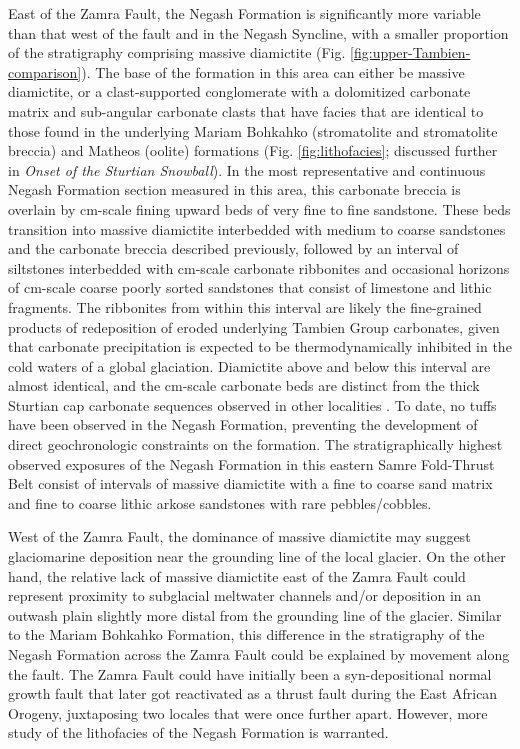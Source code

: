 East of the Zamra Fault, the Negash Formation is significantly more variable than that west of the fault and in the Negash Syncline, with a smaller proportion of the stratigraphy comprising massive diamictite (Fig. \ref{fig:upper-Tambien-comparison}). The base of the formation in this area can either be massive diamictite, or a clast-supported conglomerate with a dolomitized carbonate matrix and sub-angular carbonate clasts that have facies that are identical to those found in the underlying Mariam Bohkahko (stromatolite and stromatolite breccia) and Matheos (oolite) formations (Fig. \ref{fig:lithofacies}; discussed further in \textit{Onset of the Sturtian Snowball}). In the most representative and continuous Negash Formation section measured in this area, this carbonate breccia is overlain by cm-scale fining upward beds of very fine to fine sandstone. These beds transition into massive diamictite interbedded with medium to coarse sandstones and the carbonate breccia described previously, followed by an interval of siltstones interbedded with cm-scale carbonate ribbonites and occasional horizons of cm-scale coarse poorly sorted sandstones that consist of limestone and lithic fragments. The ribbonites from within this interval are likely the fine-grained products of redeposition of eroded underlying Tambien Group carbonates, given that carbonate precipitation is expected to be thermodynamically inhibited in the cold waters of a global glaciation. Diamictite above and below this interval are almost identical, and the cm-scale carbonate beds are distinct from the thick Sturtian cap carbonate sequences observed in other localities \citep{Kennedy1998a, Hoffman2011a}. To date, no tuffs have been observed in the Negash Formation, preventing the development of direct geochronologic constraints on the formation. The stratigraphically highest observed exposures of the Negash Formation in this eastern Samre Fold-Thrust Belt consist of intervals of massive diamictite with a fine to coarse sand matrix and fine to coarse lithic arkose sandstones with rare pebbles/cobbles.

West of the Zamra Fault, the dominance of massive diamictite may suggest glaciomarine deposition near the grounding line of the local glacier. On the other hand, the relative lack of massive diamictite east of the Zamra Fault could represent proximity to subglacial meltwater channels and/or deposition in an outwash plain slightly more distal from the grounding line of the glacier. Similar to the Mariam Bohkahko Formation, this difference in the stratigraphy of the Negash Formation across the Zamra Fault could be explained by movement along the fault. The Zamra Fault could have initially been a syn-depositional normal growth fault that later got reactivated as a thrust fault during the East African Orogeny, juxtaposing two locales that were once further apart. However, more study of the lithofacies of the Negash Formation is warranted.

